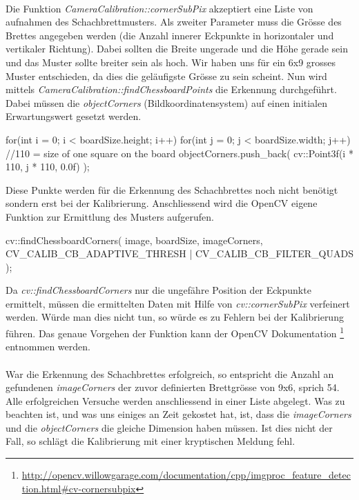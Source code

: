 \paragraph{}
Die Funktion \textit{CameraCalibration::cornerSubPix} akzeptiert eine Liste von aufnahmen des Schachbrettmusters. Als zweiter Parameter muss die Grösse des Brettes angegeben werden (die Anzahl innerer Eckpunkte in horizontaler und vertikaler Richtung). Dabei sollten die Breite ungerade und die Höhe gerade sein und das Muster sollte breiter sein als hoch. Wir haben uns für ein 6x9 grosses Muster entschieden, da dies die geläufigste Grösse zu sein scheint. Nun wird mittels \textit{CameraCalibration::findChessboardPoints} die Erkennung durchgeführt. Dabei müssen die \textit{objectCorners} (Bildkoordinatensystem) auf einen initialen Erwartungswert gesetzt werden.

\begin{c++code}
for(int i = 0; i < boardSize.height; i++)
{
    for(int j = 0; j < boardSize.width; j++)
    {
        //110 = size of one square on the board
        objectCorners.push_back(
            cv::Point3f(i * 110, j * 110, 0.0f)
        );
    }
}
\end{c++code}
\noindent
Diese Punkte werden für die Erkennung des Schachbrettes noch nicht benötigt sondern erst bei der Kalibrierung. Anschliessend wird die OpenCV eigene Funktion zur Ermittlung des Musters aufgerufen.

\begin{c++code}
cv::findChessboardCorners(
    image, 
    boardSize, 
    imageCorners, 
    CV_CALIB_CB_ADAPTIVE_THRESH | CV_CALIB_CB_FILTER_QUADS
);
\end{c++code}
\noindent
Da \textit{cv::findChessboardCorners} nur die ungefähre Position der Eckpunkte ermittelt, müssen die ermittelten Daten mit Hilfe von \textit{cv::cornerSubPix} verfeinert werden. Würde man dies nicht tun, so würde es zu Fehlern bei der Kalibrierung führen. Das genaue Vorgehen der Funktion kann der OpenCV Dokumentation \footnote{\protect\url{http://opencv.willowgarage.com/documentation/cpp/imgproc_feature_detection.html#cv-cornersubpix}} entnommen werden.

\paragraph{}War die Erkennung des Schachbrettes erfolgreich, so entspricht die Anzahl an gefundenen \textit{imageCorners} der zuvor definierten Brettgrösse von 9x6, sprich 54. Alle erfolgreichen Versuche werden anschliessend in einer Liste abgelegt. Was zu beachten ist, und was uns einiges an Zeit gekostet hat, ist, dass die \textit{imageCorners} und die \textit{objectCorners} die gleiche Dimension haben müssen. Ist dies nicht der Fall, so schlägt die Kalibrierung mit einer kryptischen Meldung fehl.

